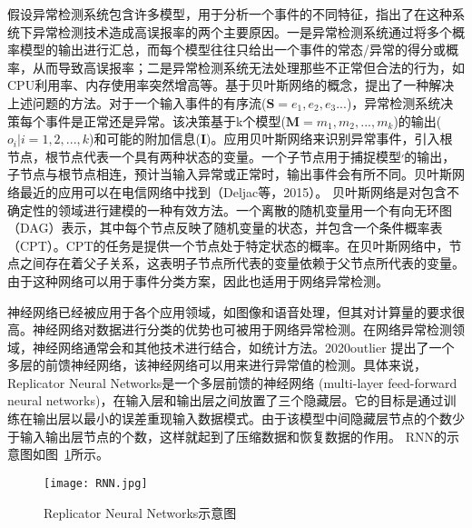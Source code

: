 \citet{kruegel2003bayesian} 假设异常检测系统包含许多模型，用于分析一个事件的不同特征，指出了在这种系统下异常检测技术造成高误报率的两个主要原因。一是异常检测系统通过将多个概率模型的输出进行汇总，而每个模型往往只给出一个事件的常态/异常的得分或概率，从而导致高误报率；二是异常检测系统无法处理那些不正常但合法的行为，如CPU利用率、内存使用率突然增高等。基于贝叶斯网络的概念，\citet{kruegel2003bayesian}提出了一种解决上述问题的方法。对于一个输入事件的有序流($\symbf{S}=e_1,e_2,e_3...$)，异常检测系统决策每个事件是正常还是异常。该决策基于k个模型($\symbf{M}=m_1,m_2,...,m_k$)的输出($o_i|i=1,2,...,k$)和可能的附加信息($\symbf{I}$)。应用贝叶斯网络来识别异常事件，引入根节点，根节点代表一个具有两种状态的变量。一个子节点用于捕捉模型׳的输出，子节点与根节点相连，预计当输入异常或正常时，输出事件会有所不同。贝叶斯网络最近的应用可以在电信网络中找到（Deljac等，2015）。
贝叶斯网络是对包含不确定性的领域进行建模的一种有效方法。一个离散的随机变量用一个有向无环图（DAG）表示，其中每个节点反映了随机变量的状态，并包含一个条件概率表（CPT）。CPT的任务是提供一个节点处于特定状态的概率。在贝叶斯网络中，节点之间存在着父子关系，这表明子节点所代表的变量依赖于父节点所代表的变量。由于这种网络可以用于事件分类方案，因此也适用于网络异常检测。


神经网络已经被应用于各个应用领域，如图像和语音处理，但其对计算量的要求很高。神经网络对数据进行分类的优势也可被用于网络异常检测。在网络异常检测领域，神经网络通常会和其他技术进行结合，如统计方法。2020outlier 提出了一个多层的前馈神经网络，该神经网络可以用来进行异常值的检测。具体来说，Replicator Neural Networks是一个多层前馈的神经网络 (multi-layer feed-forward neural networks)，在输入层和输出层之间放置了三个隐藏层。它的目标是通过训练在输出层以最小的误差重现输入数据模式。由于该模型中间隐藏层节点的个数少于输入输出层节点的个数，这样就起到了压缩数据和恢复数据的作用。
RNN的示意图如图~\ref{fig:rnn}所示。

\begin{figure}
    \centering
    \texttt{[image: RNN.jpg]}
    \caption{Replicator Neural Networks示意图}
    \label{fig:rnn}
  \end{figure}

